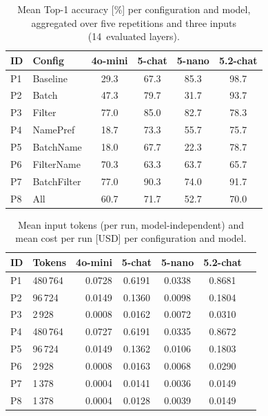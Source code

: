 \documentclass[10pt, a4paper, twocolumn]{article}
\begin{document}
\begin{table}[htbp]
  \caption{Mean Top-1 accuracy [\%] per configuration and model, aggregated over five
           repetitions and three inputs (14~evaluated layers).}
  \label{tab:acc}
  \centering
  \small
  \begin{tabular}{llcccc}
    \toprule
    \textbf{ID} & \textbf{Config} & \textbf{4o-mini} & \textbf{5-chat} & \textbf{5-nano} & \textbf{5.2-chat} \\
    \midrule
    P1 & Baseline    & 29.3 & 67.3 & 85.3 & 98.7 \\
    P2 & Batch       & 47.3 & 79.7 & 31.7 & 93.7 \\
    P3 & Filter      & 77.0 & 85.0 & 82.7 & 78.3 \\
    P4 & NamePref    & 18.7 & 73.3 & 55.7 & 75.7 \\
    P5 & BatchName   & 18.0 & 67.7 & 22.3 & 78.7 \\
    P6 & FilterName  & 70.3 & 63.3 & 63.7 & 65.7 \\
    P7 & BatchFilter & 77.0 & 90.3 & 74.0 & 91.7 \\
    P8 & All         & 60.7 & 71.7 & 52.7 & 70.0 \\
    \bottomrule
  \end{tabular}
\end{table}

\begin{table}[htbp]
  \caption{Mean input tokens (per run, model-independent) and mean cost per run [USD]
           per configuration and model.}
  \label{tab:cost}
  \centering
  \small
  \begin{tabular}{llrcccc}
    \toprule
    \textbf{ID}  & \textbf{Tokens} & \textbf{4o-mini} & \textbf{5-chat} & \textbf{5-nano} & \textbf{5.2-chat} \\
    \midrule
    P1     & 480\,764 & 0.0728 & 0.6191 & 0.0338 & 0.8681 \\
    P2        &  96\,724 & 0.0149 & 0.1360 & 0.0098 & 0.1804 \\
    P3       &   2\,928 & 0.0008 & 0.0162 & 0.0072 & 0.0310 \\
    P4     & 480\,764 & 0.0727 & 0.6191 & 0.0335 & 0.8672 \\
    P5    &  96\,724 & 0.0149 & 0.1362 & 0.0106 & 0.1803 \\
    P6   &   2\,928 & 0.0008 & 0.0163 & 0.0068 & 0.0290 \\
    P7  &   1\,378 & 0.0004 & 0.0141 & 0.0036 & 0.0149 \\
    P8          &   1\,378 & 0.0004 & 0.0128 & 0.0039 & 0.0149 \\
    \bottomrule
  \end{tabular}
\end{table}
\end{document}
